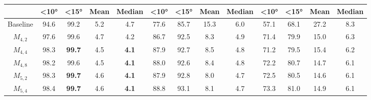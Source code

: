 \begin{table}[t]
{\begin{adjustbox}{width=1.3\textwidth,center}
\begin{tabular}{|c|cccc|cccc|cccc|}
                & \textbf{\textless{}10°} & \textbf{\textless{}15°} & \textbf{Mean} & \textbf{Median} & \textbf{\textless{}10°} & \textbf{\textless{}15°} & \textbf{Mean} & \textbf{Median} & \textbf{\textless{}10°} & \textbf{\textless{}15°} & \textbf{Mean} & \textbf{Median} \\ \hline
                Baseline & 94.6                         & 99.2                         & 5.2           & 4.7           & 77.6                         & 85.7                         & 15.3          & 6.0           & 57.1                         & 68.1                         & 27.2          & 8.3           \\
                $M_{4,2}$                        & 97.6                         & 99.6                         & 4.7           & 4.2           & 86.7                         & 92.5                         & 8.3          & 4.9           & 71.4                         & 79.9                         & 15.0          & 6.3           \\
                $M_{4,4}$                        & 98.3                         & \textbf{99.7}                         & 4.5           & \textbf{4.1}           & 87.9                         & 92.7                         & 8.5          & 4.8           & 71.2                         & 79.5                         & 15.4          & 6.2           \\
                $M_{4,8}$                        & 98.2                         & 99.6                         & 4.5           & \textbf{4.1}           & 88.0                         & 92.6                         & 8.4          & 4.8           & 72.2                         & 80.7                         & 14.7          & 6.1           \\
                $M_{5,2}$                        & 98.3                         & \textbf{99.7}                         & 4.6           & \textbf{4.1}           & 87.9                         & 92.8                         & 8.0          & 4.7           & 72.5                         & 80.5                         & 14.6          & 6.1           \\
                $M_{5,4}$                        & 98.4                         & \textbf{99.7}                         & 4.6           & \textbf{4.1}           & 88.8                         & 93.1                         & 8.1          & 4.7           & 73.3                         & 81.0                         & 14.9          & 6.1           \\

\end{tabular}
\end{adjustbox}}
\end{table}
